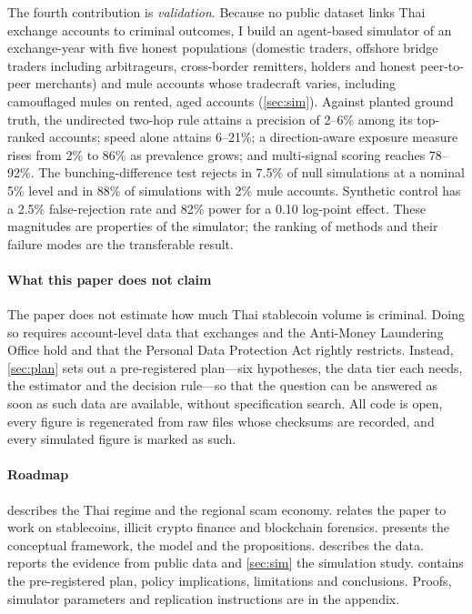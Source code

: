 The fourth contribution is \emph{validation}. Because no public dataset links Thai exchange accounts to criminal
outcomes, I build an agent-based simulator of an exchange-year with five honest populations (domestic traders,
offshore bridge traders including arbitrageurs, cross-border remitters, holders and honest peer-to-peer merchants) and
mule accounts whose tradecraft varies, including camouflaged mules on rented, aged accounts (\cref{sec:sim}). Against
planted ground truth, the undirected two-hop rule attains a precision of 2--6\% among its top-ranked accounts; speed
alone attains 6--21\%; a direction-aware exposure measure rises from 2\% to 86\% as prevalence grows; and multi-signal
scoring reaches 78--92\%. The bunching-difference test rejects in 7.5\% of null simulations at a nominal 5\% level and
in 88\% of simulations with 2\% mule accounts. Synthetic control has a 2.5\% false-rejection rate and 82\% power for a
0.10 log-point effect. These magnitudes are properties of the simulator; the ranking of methods and their failure modes
are the transferable result.

\paragraph{What this paper does not claim}
The paper does not estimate how much Thai stablecoin volume is criminal. Doing so requires account-level data that
exchanges and the Anti-Money Laundering Office hold and that the Personal Data Protection Act rightly restricts.
Instead, \cref{sec:plan} sets out a pre-registered plan---six hypotheses, the data tier each needs, the estimator and
the decision rule---so that the question can be answered as soon as such data are available, without specification
search. All code is open, every figure is regenerated from raw files whose checksums are recorded, and every
simulated figure is marked as such.

\paragraph{Roadmap}
 describes the Thai regime and the regional scam economy.  relates the paper
to work on stablecoins, illicit crypto finance and blockchain forensics.  presents the conceptual
framework, the model and the propositions.  describes the data.  reports the
evidence from public data and \cref{sec:sim} the simulation study.  contains the pre-registered plan,
policy implications, limitations and conclusions. Proofs, simulator parameters and replication instructions are in the
appendix.
